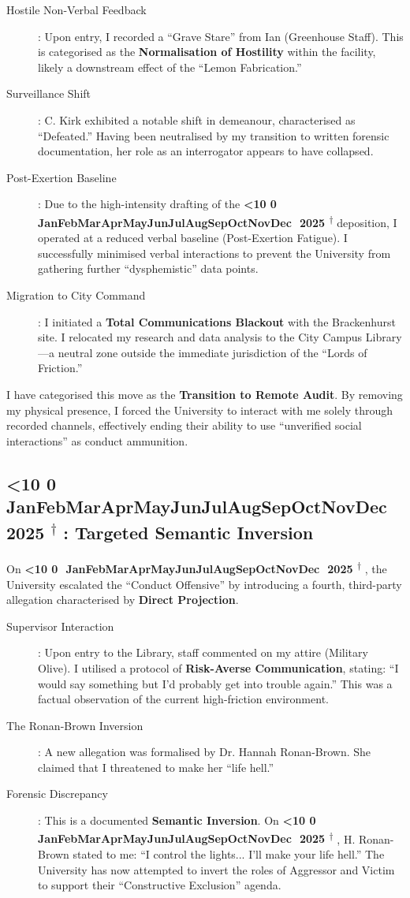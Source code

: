 \documentclass{EMBASSY}
\DeclareRobustCommand{\gmt}[3]{%
    \texorpdfstring{%
        {\color{DateGold}\textbf{%
            \ifnum#1<10 0\fi#1\,\textperiodcentered\,%
            \ifcase#2\or Jan\or Feb\or Mar\or Apr\or May\or Jun\or Jul\or Aug\or Sep\or Oct\or Nov\or Dec\fi
            \,\textperiodcentered\,20#3%
            \textsuperscript{$\dagger$}%
        }}%
    }{%
        (#1/#2/#3)%
    }%
}
\begin{document}
\begin{description}
	\item[Hostile Non-Verbal Feedback]: Upon entry, I recorded a ``Grave Stare'' from Ian (Greenhouse Staff). This is categorised as the \textbf{Normalisation of Hostility} within the facility, likely a downstream effect of the ``Lemon Fabrication.''
	\item[Surveillance Shift]: C. Kirk exhibited a notable shift in demeanour, characterised as ``Defeated.'' Having been neutralised by my transition to written forensic documentation, her role as an interrogator appears to have collapsed.
	\item[Post-Exertion Baseline]: Due to the high-intensity drafting of the \gmt{9}{11}{25} deposition, I operated at a reduced verbal baseline (Post-Exertion Fatigue). I successfully minimised verbal interactions to prevent the University from gathering further ``dysphemistic'' data points.
	\item[Migration to City Command]: I initiated a \textbf{Total Communications Blackout} with the Brackenhurst site. I relocated my research and data analysis to the City Campus Library---a neutral zone outside the immediate jurisdiction of the ``Lords of Friction.''
\end{description}

\noindent I have categorised this move as the \textbf{Transition to Remote Audit}. By removing my physical presence, I forced the University to interact with me solely through recorded channels, effectively ending their ability to use ``unverified social interactions'' as conduct ammunition.

\subsection{\gmt{12}{11}{25}: Targeted Semantic Inversion}
On \gmt{12}{11}{25}, the University escalated the ``Conduct Offensive'' by introducing a fourth, third-party allegation characterised by \textbf{Direct Projection}.

\begin{description}
	\item[Supervisor Interaction]: Upon entry to the Library, staff commented on my attire (Military Olive). I utilised a protocol of \textbf{Risk-Averse Communication}, stating: ``I would say something but I'd probably get into trouble again.'' This was a factual observation of the current high-friction environment.
	\item[The Ronan-Brown Inversion]: A new allegation was formalised by Dr. Hannah Ronan-Brown. She claimed that I threatened to make her ``life hell.''
	\item[Forensic Discrepancy]: This is a documented \textbf{Semantic Inversion}. On \gmt{4}{11}{25}, H. Ronan-Brown stated to me: ``I control the lights... I'll make your life hell.'' The University has now attempted to invert the roles of Aggressor and Victim to support their ``Constructive Exclusion'' agenda.
\end{description}
\end{document}
